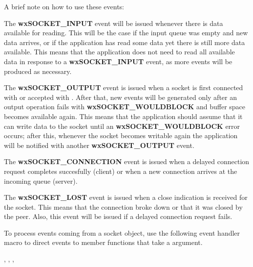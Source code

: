 A brief note on how to use these events:

The {\bf wxSOCKET\_INPUT} event will be issued whenever there is data
available for reading. This will be the case if the input queue was
empty and new data arrives, or if the application has read some data
yet there is still more data available. This means that the application
does not need to read all available data in response to a
{\bf wxSOCKET\_INPUT} event, as more events will be produced as
necessary.

The {\bf wxSOCKET\_OUTPUT} event is issued when a socket is first
connected with  or accepted
with . After that, new
events will be generated only after an output operation fails
with {\bf wxSOCKET\_WOULDBLOCK} and buffer space becomes available
again. This means that the application should assume that it
can write data to the socket until an {\bf wxSOCKET\_WOULDBLOCK}
error occurs; after this, whenever the socket becomes writable
again the application will be notified with another
{\bf wxSOCKET\_OUTPUT} event.

The {\bf wxSOCKET\_CONNECTION} event is issued when a delayed connection
request completes succesfully (client) or when a new connection arrives
at the incoming queue (server).

The {\bf wxSOCKET\_LOST} event is issued when a close indication is
received for the socket. This means that the connection broke down or
that it was closed by the peer. Also, this event will be issued if
a delayed connection request fails.


To process events coming from a socket object, use the following event
handler macro to direct events to member functions that take a
 argument.

\twocolwidtha{7cm}%
\begin{twocollist}\itemsep=0pt
\end{twocollist}


, 
, 
,


